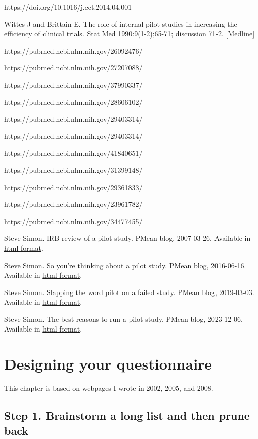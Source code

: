 \documentclass[
  letterpaper,
  DIV=11,
  numbers=noendperiod]{scrreprt}
\begin{document}
https://doi.org/10.1016/j.cct.2014.04.001

Wittes J and Brittain E. The role of internal pilot studies in
increasing the efficiency of clinical trials. Stat Med
1990:9(1-2);65-71; discussion 71-2. {[}Medline{]}

https://pubmed.ncbi.nlm.nih.gov/26092476/

https://pubmed.ncbi.nlm.nih.gov/27207088/

https://pubmed.ncbi.nlm.nih.gov/37990337/

https://pubmed.ncbi.nlm.nih.gov/28606102/

https://pubmed.ncbi.nlm.nih.gov/29403314/

https://pubmed.ncbi.nlm.nih.gov/29403314/

https://pubmed.ncbi.nlm.nih.gov/41840651/

https://pubmed.ncbi.nlm.nih.gov/31399148/

https://pubmed.ncbi.nlm.nih.gov/29361833/

https://pubmed.ncbi.nlm.nih.gov/23961782/

https://pubmed.ncbi.nlm.nih.gov/34477455/

Steve Simon. IRB review of a pilot study. PMean blog, 2007-03-26.
Available in \href{http://pmean.com/posts/irb-review-pilot/}{html
format}.

Steve Simon. So you're thinking about a pilot study. PMean blog,
2016-06-16. Available in \href{http://blog.pmean.com/pilot-study/}{html
format}.

Steve Simon. Slapping the word pilot on a failed study. PMean blog,
2019-03-03. Available in
\href{http://pmean.com/posts/failed-study/}{html format}.

Steve Simon. The best reasons to run a pilot study. PMean blog,
2023-12-06. Available in
\href{http://pmean.com/posts/reasons-to-run-a-pilot/}{html format}.


\chapter{Designing your
questionnaire}\label{designing-your-questionnaire}

This chapter is based on webpages I wrote in 2002, 2005, and 2008.

\section{Step 1. Brainstorm a long list and then prune
back}\label{step-1.-brainstorm-a-long-list-and-then-prune-back}
\end{document}
